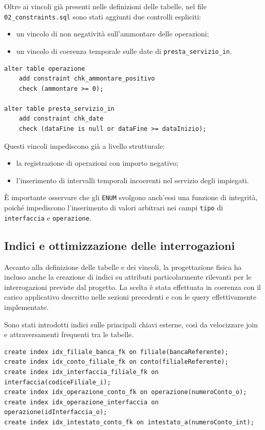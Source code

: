 Oltre ai vincoli già presenti nelle definizioni delle tabelle, nel file \texttt{02\_constraints.sql} sono stati aggiunti due controlli espliciti:
\begin{itemize}
    \item un vincolo di non negatività sull'ammontare delle operazioni;
    \item un vincolo di coerenza temporale sulle date di \texttt{presta\_servizio\_in}.
\end{itemize}

\begin{lstlisting}[caption={Vincoli aggiuntivi sullo schema fisico}]
alter table operazione
    add constraint chk_ammontare_positivo
    check (ammontare >= 0);

alter table presta_servizio_in
    add constraint chk_date
    check (dataFine is null or dataFine >= dataInizio);
\end{lstlisting}

Questi vincoli impediscono già a livello strutturale:
\begin{itemize}
    \item la registrazione di operazioni con importo negativo;
    \item l'inserimento di intervalli temporali incoerenti nel servizio degli impiegati.
\end{itemize}

È importante osservare che gli \texttt{ENUM} svolgono anch'essi una funzione di integrità, poiché impediscono l'inserimento di valori arbitrari nei campi \texttt{tipo} di \texttt{interfaccia} e \texttt{operazione}.

\subsection{Indici e ottimizzazione delle interrogazioni}
Accanto alla definizione delle tabelle e dei vincoli, la progettazione fisica ha incluso anche la creazione di indici su attributi particolarmente rilevanti per le interrogazioni previste dal progetto. La scelta è stata effettuata in coerenza con il carico applicativo descritto nelle sezioni precedenti e con le query effettivamente implementate.

Sono stati introdotti indici sulle principali chiavi esterne, così da velocizzare join e attraversamenti frequenti tra le tabelle.

\begin{lstlisting}[caption={Indici sulle principali chiavi esterne}]
create index idx_filiale_banca_fk on filiale(bancaReferente);
create index idx_conto_filiale_fk on conto(filialeReferente);
create index idx_interfaccia_filiale_fk on interfaccia(codiceFiliale_i);
create index idx_operazione_conto_fk on operazione(numeroConto_o);
create index idx_operazione_interfaccia on operazione(idInterfaccia_o);
create index idx_intestato_conto_fk on intestato_a(numeroConto_int);
\end{lstlisting}

